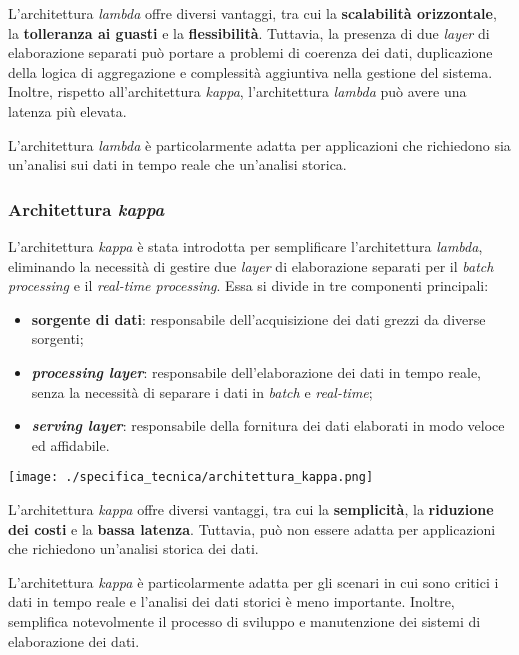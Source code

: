 L'architettura \textit{lambda} offre diversi vantaggi, tra cui la \textbf{scalabilità orizzontale}, la \textbf{tolleranza ai guasti} e la \textbf{flessibilità}. Tuttavia, la presenza
di due \textit{layer} di elaborazione separati può portare a problemi di coerenza dei dati, duplicazione della logica di aggregazione e complessità aggiuntiva nella gestione del sistema.
Inoltre, rispetto all'architettura \textit{kappa}, l'architettura \textit{lambda} può avere una latenza più elevata.

L'architettura \textit{lambda} è particolarmente adatta per applicazioni che richiedono sia un'analisi sui dati in tempo reale che un'analisi storica.

\subsubsection{Architettura \textit{kappa}}
L'architettura \textit{kappa} è stata introdotta per semplificare l'architettura \textit{lambda}, eliminando la necessità di gestire due \textit{layer} di elaborazione separati per il \textit{batch processing} e il \textit{real-time processing}.
Essa si divide in tre componenti principali:
\begin{itemize}
	\item \textbf{sorgente di dati}: responsabile dell'acquisizione dei dati grezzi da diverse sorgenti;
	\item \textbf{\textit{processing layer}}: responsabile dell'elaborazione dei dati in tempo reale, senza la necessità di separare i dati in \textit{batch} e \textit{real-time};
	\item \textbf{\textit{serving layer}}: responsabile della fornitura dei dati elaborati in modo veloce ed affidabile.
\end{itemize}

\begin{center}
	\texttt{[image: ./specifica\_tecnica/architettura\_kappa.png]}
\end{center}

L'architettura \textit{kappa} offre diversi vantaggi, tra cui la \textbf{semplicità}, la \textbf{riduzione dei costi} e la \textbf{bassa latenza}.
Tuttavia, può non essere adatta per applicazioni che richiedono un'analisi storica dei dati.

L'architettura \textit{kappa} è particolarmente adatta per gli scenari in cui sono critici i dati in tempo reale e l'analisi dei dati storici è meno importante. Inoltre, semplifica notevolmente il processo di sviluppo e manutenzione dei sistemi di elaborazione dei dati.

